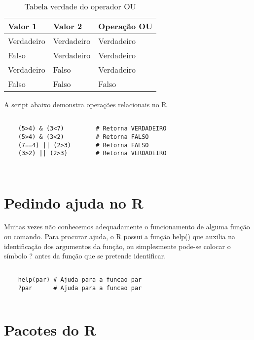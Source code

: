 \FloatBarrier
\begin{table}[h]
	\centering
	\begin{tabular}{@{}lll@{}}
		\toprule
		Valor 1    & Valor 2    & Operação OU \\ \midrule
		Verdadeiro & Verdadeiro & Verdadeiro \\
		Falso      & Verdadeiro & Verdadeiro     \\
		Verdadeiro & Falso      & Verdadeiro     \\
		Falso      & Falso      & Falso      \\ \bottomrule
	\end{tabular}
	\caption{Tabela verdade do operador OU}
	\label{tab:my-table}
\end{table}
\FloatBarrier

A script abaixo demonstra operações relacionais no R

\begin{scriptsize}
	\estiloR
	\begin{lstlisting}[caption={Exemplo de operadores relacionais no R}, label=lst:rcode]
	
	(5>4) & (3<7)         # Retorna VERDADEIRO
	(5>4) & (3<2)         # Retorna FALSO 
	(7==4) || (2>3)       # Retorna FALSO
	(3>2) || (2>3)        # Retorna VERDADEIRO
	
	
	\end{lstlisting}
\end{scriptsize}

\section{Pedindo ajuda no R} 


Muitas vezes não conhecemos adequadamente o funcionamento de alguma função ou comando. Para procurar ajuda, o R possui a função help() que auxilia na identificação dos argumentos da função, ou simplesmente pode-se colocar o símbolo ? antes da função que se pretende identificar.

\begin{scriptsize}
	\estiloR
	\begin{lstlisting}[caption={Exemplo de ajuda utilizando a função help}, label=lst:rcode]
	
	help(par) # Ajuda para a funcao par 
	?par      # Ajuda para a funcao par 
	
	\end{lstlisting}
\end{scriptsize} 

\section{Pacotes do R}

